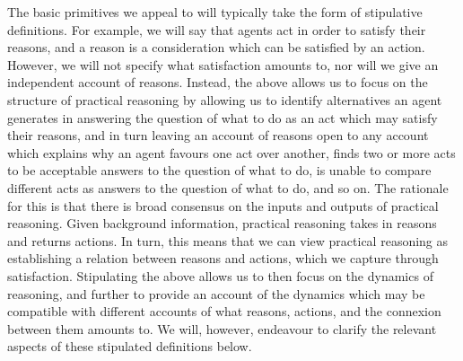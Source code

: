 \documentclass[10pt]{article}
\begin{document}
The basic primitives we appeal to will typically take the form of stipulative definitions.
For example, we will say that agents act in order to satisfy their reasons, and a reason is a consideration which can be satisfied by an action.
However, we will not specify what satisfaction amounts to, nor will we give an independent account of reasons.
Instead, the above allows us to focus on the structure of practical reasoning by allowing us to identify alternatives an agent generates in answering the question of what to do as an act which may satisfy their reasons, and in turn leaving an account of reasons open to any account which explains why an agent favours one act over another, finds two or more acts to be acceptable answers to the question of what to do, is unable to compare different acts as answers to the question of what to do, and so on.
The rationale for this is that there is broad consensus on the inputs and outputs of practical reasoning.
Given background information, practical reasoning takes in reasons and returns actions.
In turn, this means that we can view practical reasoning as establishing a relation between reasons and actions, which we capture through satisfaction.
Stipulating the above allows us to then focus on the dynamics of reasoning, and further to provide an account of the dynamics which may be compatible with different accounts of what reasons, actions, and the connexion between them amounts to.
We will, however, endeavour to clarify the relevant aspects of these stipulated definitions below.
\end{document}
